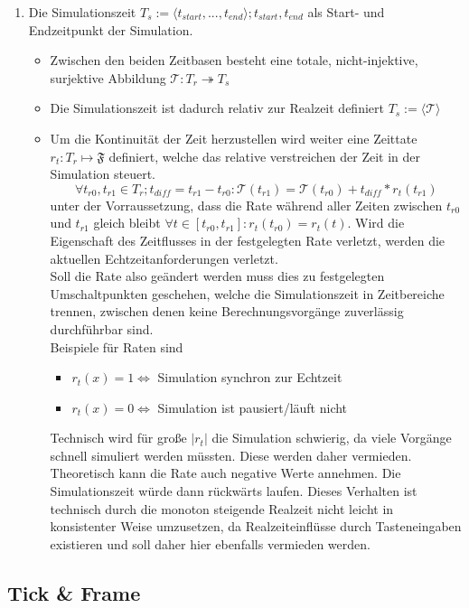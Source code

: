 \begin{enumerate}
\item Die Simulationszeit $T_s:=\langle t_{start}, ... , t_{end}\rangle; t_{start}, t_{end}$ als Start- und Endzeitpunkt der Simulation.
	\begin{itemize}
	\item Zwischen den beiden Zeitbasen besteht eine totale, nicht-injektive, surjektive Abbildung $\mathcal{T}:T_r \twoheadrightarrow T_s$
	\item Die Simulationszeit ist dadurch relativ zur Realzeit definiert $T_s:=\langle\mathcal{T}\rangle$
	\item Um die Kontinuität der Zeit herzustellen wird weiter eine Zeittate $r_t:T_r\mapsto\mathfrak{F}$ definiert, welche das relative verstreichen der Zeit in der Simulation steuert. 
	$$\forall t_{r0},  t_{r1} \in T_r ; t_{diff}=t_{r1}-t_{r0} :\mathcal{T}(t_{r1}) = \mathcal{T}(t_{r0}) + t_{diff}*r_t(t_{r1})$$ unter der Vorraussetzung, dass die Rate während aller Zeiten zwischen $t_{r0}$ und $t_{r1}$ gleich bleibt $\forall t \in [ t_{r0},t_{r1}]: r_t( t_{r0}) = r_t(t)$. Wird die Eigenschaft des Zeitflusses in der festgelegten Rate verletzt, werden die aktuellen Echtzeitanforderungen verletzt. \\
	Soll die Rate also geändert werden muss dies zu festgelegten Umschaltpunkten geschehen, welche die Simulationszeit in Zeitbereiche trennen, zwischen denen keine Berechnungsvorgänge zuverlässig durchführbar sind.\\
Beispiele für Raten sind 
\begin{itemize}
\item $r_t(x) = 1 \Leftrightarrow$ Simulation synchron zur Echtzeit
\item $r_t(x) = 0 \Leftrightarrow$ Simulation ist pausiert/läuft nicht
\end{itemize}
Technisch wird für große $|r_t|$ die Simulation schwierig, da viele Vorgänge schnell simuliert werden müssten. Diese werden daher vermieden.\\
Theoretisch kann die Rate auch negative Werte annehmen. Die Simulationszeit würde dann rückwärts laufen. Dieses Verhalten ist technisch durch die monoton steigende Realzeit nicht leicht in konsistenter Weise umzusetzen, da Realzeiteinflüsse durch Tasteneingaben existieren und soll daher hier ebenfalls vermieden werden.
	\end{itemize}
\end{enumerate}	


\subsection{Tick \& Frame}


